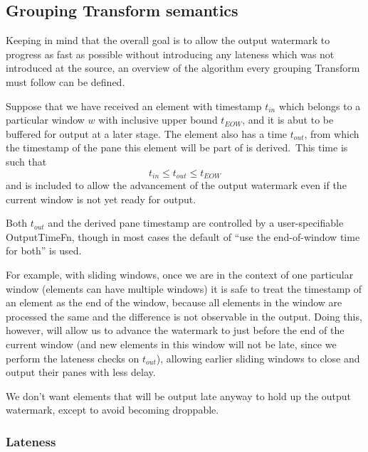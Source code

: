 \subsection{Grouping Transform semantics}


Keeping in mind that the overall goal is to allow the output watermark to progress as fast as possible without introducing any lateness which was not introduced at the source, an overview of the algorithm every grouping Transform must follow can be defined.

Suppose that we have received an element with timestamp $t_{\mathit{in}}$ which belongs to a particular window $w$ with inclusive upper bound $t_{\mathit{EOW}}$, and it is abut to be buffered for output at a later stage.
The element also has a time $t_{\mathit{out}}$, from which the timestamp of the pane this element will be part of is derived.\footnotemark\ 
This time is such that \[t_{\mathit{in}} \leq t_{\mathit{out}} \leq t_{\mathit{EOW}}\] and is included to allow the advancement of the output watermark even if the current window is not yet ready for output.

\footnotetext
{
Both $t_{\mathit{out}}$ and the derived pane timestamp are controlled by a user-specifiable OutputTimeFn, though in most cases the default of ``use the end-of-window time for both'' is used.
}

For example, with sliding windows, once we are in the context of one particular window (elements can have multiple windows) it is safe to treat the timestamp of an element as the end of the window, because all elements in the window are processed the same and the difference is not observable in the output.
Doing this, however, will allow us to advance the watermark to just before the end of the current window (and new elements in this window will not be late, since we perform the lateness checks on $t_{\mathit{out}}$), allowing earlier sliding windows to close and output their panes with less delay.



We don't want elements that will be output late anyway to hold up the output watermark, except to avoid becoming droppable.


\subsubsection{Lateness}

